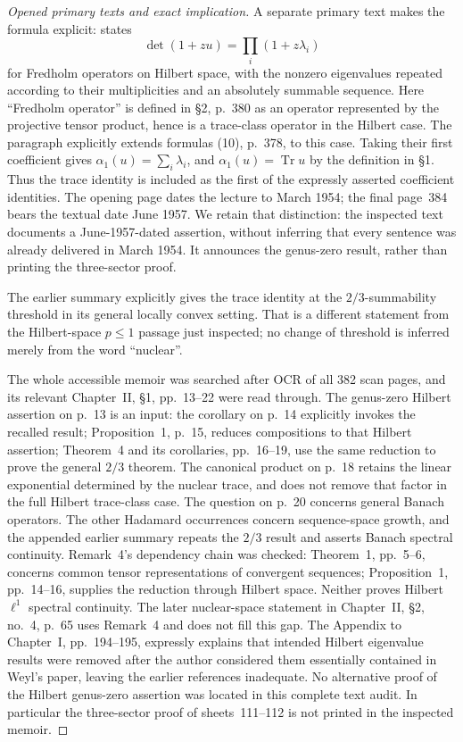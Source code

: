 \begin{proof}[Opened primary texts and exact implication]
A separate primary text makes the formula explicit:
\cite[\S4(c), printed p.~383, formula (24)]{GrothendieckBourbaki91} states
\[
 \det(1+zu)=\prod_i(1+z\lambda_i)
\]
for Fredholm operators on Hilbert space, with the nonzero eigenvalues
repeated according to their multiplicities and an absolutely summable
sequence. Here ``Fredholm operator'' is defined in \S2, p.~380 as an
operator represented by the projective tensor product, hence is a
trace-class operator in the Hilbert case. The paragraph explicitly extends
formulas (10), p.~378, to this case. Taking their first coefficient gives
$\alpha_1(u)=\sum_i\lambda_i$, and $\alpha_1(u)=\operatorname{Tr}u$
by the definition in \S1. Thus the trace identity is included as the
first of the expressly asserted coefficient identities.
The opening page dates the lecture to March 1954; the final page~384
bears the textual date June 1957. We retain that distinction: the
inspected text documents a June-1957-dated assertion, without inferring
that every sentence was already delivered in March 1954. It announces
the genus-zero result, rather than printing the three-sector proof.

The earlier summary \cite[Chapter II, no.~6, Theorem 8 and Corollary 2,
pp.~107--108]{Grothendieck1952Summary} explicitly gives the trace identity
at the $2/3$-summability threshold in its general locally convex setting.
That is a different statement from the Hilbert-space $p\leq1$ passage
just inspected; no change of threshold is inferred merely from the word
``nuclear''.

The whole accessible memoir was searched after OCR of all 382 scan pages,
and its relevant Chapter~II, \S1, pp.~13--22 were read through. The
genus-zero Hilbert assertion on p.~13 is an input: the corollary on p.~14
explicitly invokes the recalled result; Proposition~1, p.~15, reduces
compositions to that Hilbert assertion; Theorem~4 and its corollaries,
pp.~16--19, use the same reduction to prove the general $2/3$ theorem.
The canonical product on p.~18 retains the linear exponential determined
by the nuclear trace, and does not remove that factor in the full
Hilbert trace-class case. The question on p.~20 concerns general Banach
operators. The other Hadamard occurrences concern sequence-space growth,
and the appended earlier summary repeats the $2/3$ result and asserts
Banach spectral continuity. Remark~4's dependency chain was checked:
Theorem~1, pp.~5--6, concerns common tensor representations of convergent
sequences; Proposition~1, pp.~14--16, supplies the reduction through
Hilbert space. Neither proves Hilbert $\ell^1$ spectral continuity.
The later nuclear-space statement in Chapter~II, \S2, no.~4, p.~65
uses Remark~4 and does not fill this gap. The Appendix to Chapter~I,
pp.~194--195, expressly explains that intended Hilbert eigenvalue results
were removed after the author considered them essentially contained in
Weyl's paper, leaving the earlier references inadequate. No alternative
proof of the Hilbert genus-zero assertion was located in this complete
text audit. In particular the three-sector proof of sheets~111--112 is
not printed in the inspected memoir.


\end{proof}
